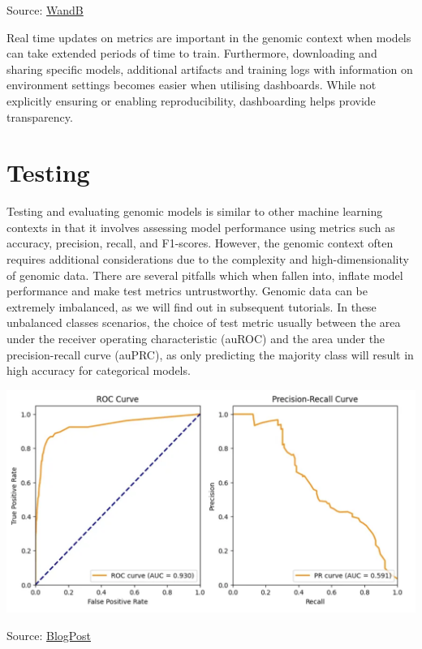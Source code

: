\documentclass[
]{book}
\begin{document}
Source: \href{https://docs.wandb.ai/quickstart}{WandB}

Real time updates on metrics are important in the genomic context when models can take extended periods of time to train. Furthermore, downloading and sharing specific models, additional artifacts and training logs with information on environment settings becomes easier when utilising dashboards. While not explicitly ensuring or enabling reproducibility, dashboarding helps provide transparency.

\chapter{Testing}\label{testing}

Testing and evaluating genomic models is similar to other machine learning contexts in that it involves assessing model performance using metrics such as accuracy, precision, recall, and F1-scores. However, the genomic context often requires additional considerations due to the complexity and high-dimensionality of genomic data. There are several pitfalls which when fallen into, inflate model performance and make test metrics untrustworthy. Genomic data can be extremely imbalanced, as we will find out in subsequent tutorials. In these unbalanced classes scenarios, the choice of test metric usually between the area under the receiver operating characteristic (auROC) and the area under the precision-recall curve (auPRC), as only predicting the majority class will result in high accuracy for categorical models.

\includegraphics{images/auroc_auprc.png}

Source: \href{https://juandelacalle.medium.com/how-and-why-i-switched-from-the-roc-curve-to-the-precision-recall-curve-to-analyze-my-imbalanced-6171da91c6b8}{BlogPost}
\end{document}
